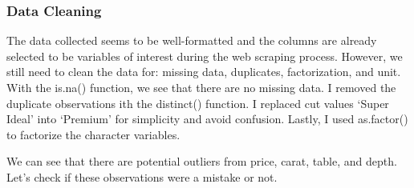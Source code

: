 \documentclass[
]{article}
\begin{document}
\hypertarget{data-cleaning}{%
\subsubsection{Data Cleaning}\label{data-cleaning}}

The data collected seems to be well-formatted and the columns are
already selected to be variables of interest during the web scraping
process. However, we still need to clean the data for: missing data,
duplicates, factorization, and unit. With the is.na() function, we see
that there are no missing data. I removed the duplicate observations ith
the distinct() function. I replaced cut values `Super Ideal' into
`Premium' for simplicity and avoid confusion. Lastly, I used as.factor()
to factorize the character variables.

\begin{table}[H]

\caption{\label{tab:unnamed-chunk-2}Summary Table (Post Cleaning)}
\centering
{}
\end{table}

We can see that there are potential outliers from price, carat, table,
and depth. Let's check if these observations were a mistake or not.
\end{document}
